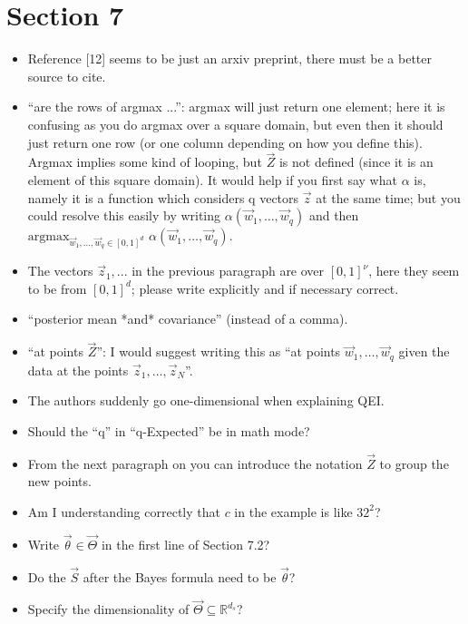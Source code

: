 \documentclass{article}[12pt]
\newcommand{\RefereeTODO}[1]{{\color{red} #1 \newline}}
\begin{document}
\section{Section 7}

\begin{itemize}
    \item \RefereeTODO{Reference [12] seems to be just an arxiv preprint, there must be a better source to cite.}
    \item \RefereeTODO{``are the rows of argmax ...'': argmax will just return one element; here it is confusing as you do argmax over a square domain, but even then it should just return one row (or one column depending on how you define this). Argmax implies some kind of looping, but $\vec{Z}$ is not defined (since it is an element of this square domain). It would help if you first say what $\alpha$ is, namely it is a function which considers q vectors $\vec{z}$ at the same time; but you could resolve this easily by writing $\alpha(\vec{w}_1, \ldots,\vec{w}_q)$ and then $\mathrm{argmax}_{\vec{w}_1,\ldots,\vec{w}_q \in [0, 1]^d}$ $\alpha(\vec{w}_1, \ldots, \vec{w}_q)$.}
    \item \RefereeTODO{The vectors $\vec{z}_1, ...$ in the previous paragraph are over $[0, 1]^\nu$, here they seem to be from $[0, 1]^d$; please write explicitly and if necessary correct.}
    \item \RefereeTODO{``posterior mean *and* covariance'' (instead of a comma).}
    \item \RefereeTODO{``at points $\vec{Z}$'': I would suggest writing this as ``at points $\vec{w}_1,\ldots,\vec{w}_q$ given the data at the points $\vec{z}_1,\ldots,\vec{z}_N$''.}
    \item \RefereeTODO{The authors suddenly go one-dimensional when explaining QEI.}
    \item \RefereeTODO{Should the ``q'' in ``q-Expected'' be in math mode?}
    \item \RefereeTODO{From the next paragraph on you can introduce the notation $\vec{Z}$ to group the new points.}
    \item \RefereeTODO{Am I understanding correctly that $c$ in the example is like $32^2$?}
    \item \RefereeTODO{Write $\vec{\theta} \in \vec{\Theta}$ in the first line of Section 7.2?}
    \item \RefereeTODO{Do the $\vec{S}$ after the Bayes formula need to be $\vec{\theta}$?}
    \item \RefereeTODO{Specify the dimensionality of $\vec{\Theta} \subseteq \mathbb{R}^{d_s}$?}

\end{itemize}
\end{document}
